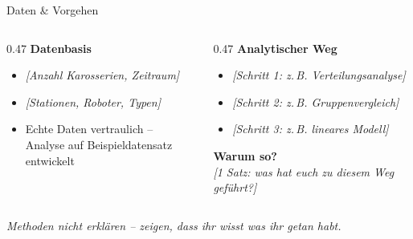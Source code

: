 \documentclass[aspectratio=169, 11pt]{beamer}
\newcommand{\hinweis}[1]{%
  \vspace{4pt}%
  {\scriptsize\color{mutedtext}\textit{#1}}%
}
\begin{document}
\begin{frame}{Daten \& Vorgehen}

  \begin{columns}[T, onlytextwidth]
    \begin{column}{0.47\textwidth}
      \textbf{Datenbasis}
      \begin{itemize}
        \item \textit{[Anzahl Karosserien, Zeitraum]}
        \item \textit{[Stationen, Roboter, Typen]}
        \item Echte Daten vertraulich --\\
          Analyse auf Beispieldatensatz entwickelt
      \end{itemize}
    \end{column}

    \begin{column}{0.47\textwidth}
      \textbf{Analytischer Weg}
      \begin{itemize}
        \item \textit{[Schritt 1: z.\,B. Verteilungsanalyse]}
        \item \textit{[Schritt 2: z.\,B. Gruppenvergleich]}
        \item \textit{[Schritt 3: z.\,B. lineares Modell]}
      \end{itemize}

      \vspace{6pt}
      \textbf{Warum so?}\\
      {\small\textit{[1 Satz: was hat euch zu diesem
      Weg geführt?]}}
    \end{column}
  \end{columns}

  \hinweis{Methoden nicht erklären -- zeigen, dass ihr wisst was ihr getan habt.}

\end{frame}
\end{document}
